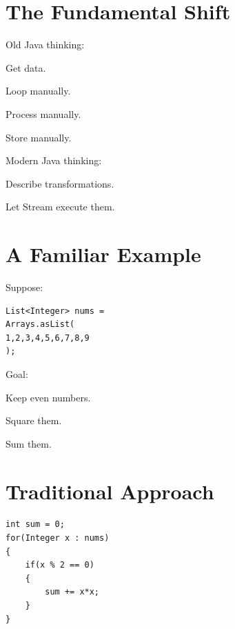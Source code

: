 \documentclass[11pt,a4paper]{book}
\begin{document}

\section{The Fundamental Shift}

Old Java thinking:


Get data.

Loop manually.

Process manually.

Store manually.


Modern Java thinking:


Describe transformations.

Let Stream execute them.


\section{A Familiar Example}

Suppose:

\begin{verbatim} 
List<Integer> nums =
Arrays.asList(
1,2,3,4,5,6,7,8,9
);
\end{verbatim}


Goal:


Keep even numbers.

Square them.

Sum them.


\section{Traditional Approach}

\begin{verbatim} 
int sum = 0;
for(Integer x : nums)
{
    if(x % 2 == 0)
    {
        sum += x*x;
    }
}
\end{verbatim}
\end{document}
